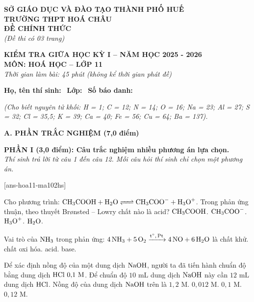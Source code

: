 \documentclass[12pt,a4paper]{article}
\begin{document}
\thispagestyle{firstpage}

\noindent
\begin{minipage}[t]{0.45\textwidth}
	\centering\fontsize{10pt}{12pt}\selectfont
	\textbf{SỞ GIÁO DỤC VÀ ĐÀO TẠO THÀNH PHỐ HUẾ}\\
	\textbf{TRƯỜNG THPT HOÁ CHÂU}\\
	\textbf{ĐỀ CHÍNH THỨC}\\
	\textit{(Đề thi có 03 trang)}
\end{minipage}\hfill
\begin{minipage}[t]{0.53\textwidth}
	\centering\small
	\textbf{KIỂM TRA GIỮA HỌC KỲ I -- NĂM HỌC 2025 - 2026}\\
	\textbf{MÔN: HOÁ HỌC -- LỚP 11}\\
	\textit{Thời gian làm bài: 45 phút (không kể thời gian phát đề)}\\
\end{minipage}

\smallskip
\noindent\hrulefill
\smallskip

\noindent\textbf{Họ, tên thí sinh:} \dotfill\ \textbf{Lớp:} \dotfill\ \textbf{Số báo danh:} \dotfill

\smallskip
\noindent\textit{(Cho biết nguyên tử khối: H = 1; C = 12; N = 14; O = 16; Na = 23; Al = 27; S = 32; Cl = 35,5; K = 39; Ca = 40; Fe = 56; Cu = 64; Ba = 137).}
\smallskip

\noindent
\textbf{\large A. PHẦN TRẮC NGHIỆM (7,0 điểm)}

\smallskip
\noindent
\textbf{PHẦN I (3,0 điểm): Câu trắc nghiệm nhiều phương án lựa chọn.}\\
\textit{Thí sinh trả lời từ câu 1 đến câu 12. Mỗi câu hỏi thí sinh chỉ chọn một phương án.}

[ans-hoa11-ma102hs]

\begin{ex}
Cho phương trình: $\ce{CH3COOH + H2O <=> CH3COO- + H3O+}$. Trong phản ứng thuận, theo thuyết Brønsted -- Lowry chất nào là acid?
\choice
{$\ce{CH3COOH}$.}
{$\ce{CH3COO-}$.}
{$\ce{H3O+}$.}
{$\ce{H2O}$.}
\loigiai{}
\end{ex}

\begin{ex}
Vai trò của $\ce{NH3}$ trong phản ứng: $\ce{4NH3 + 5O2 ->[t^\circ, \text{Pt}] 4NO + 6H2O}$ là
\choice
{chất khử.}
{chất oxi hóa.}
{acid.}
{base.}
\loigiai{}
\end{ex}

\begin{ex}
Để xác định nồng độ của một dung dịch $\ce{NaOH}$, người ta đã tiến hành chuẩn độ bằng dung dịch $\ce{HCl}\ 0{,}1\text{ M}$. Để chuẩn độ $10\text{ mL}$ dung dịch $\ce{NaOH}$ này cần $12\text{ mL}$ dung dịch $\ce{HCl}$. Nồng độ của dung dịch $\ce{NaOH}$ trên là
\choice
{$1{,}2\text{ M}$.}
{$0{,}012\text{ M}$.}
{$0{,}1\text{ M}$.}
{$0{,}12\text{ M}$.}
\loigiai{}
\end{ex}
\end{document}
